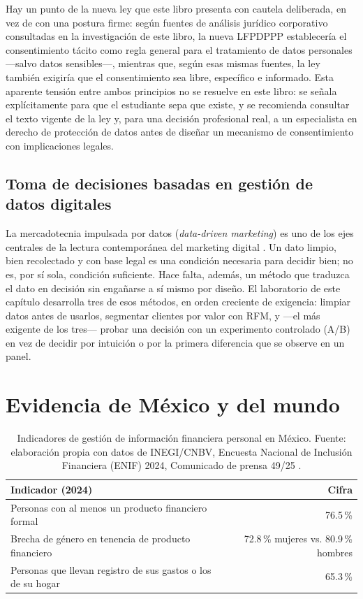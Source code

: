 Hay un punto de la nueva ley que este libro presenta con cautela deliberada,
en vez de con una postura firme: según fuentes de análisis jurídico
corporativo consultadas en la investigación de este libro, la nueva LFPDPPP
establecería el consentimiento tácito como regla general para el tratamiento
de datos personales —salvo datos sensibles—, mientras que, según esas mismas
fuentes, la ley también exigiría que el consentimiento sea libre, específico
e informado. Esta aparente tensión entre ambos principios no se resuelve en
este libro: se señala explícitamente para que el estudiante sepa que existe,
y se recomienda consultar el texto vigente de la ley y, para una decisión
profesional real, a un especialista en derecho de protección de datos antes
de diseñar un mecanismo de consentimiento con implicaciones legales.

\subsection{Toma de decisiones basadas en gestión de datos digitales}

La mercadotecnia impulsada por datos (\textit{data-driven marketing}) es uno
de los ejes centrales de la lectura contemporánea del marketing digital
\parencite{kotler2021marketing50}. Un dato limpio, bien recolectado y con
base legal es una condición necesaria para decidir bien; no es, por sí sola,
condición suficiente. Hace
falta, además, un método que traduzca el dato en decisión sin engañarse a
sí mismo por diseño. El laboratorio de este capítulo desarrolla tres de esos
métodos, en orden creciente de exigencia: limpiar datos antes de usarlos,
segmentar clientes por valor con RFM, y —el más exigente de los tres— probar
una decisión con un experimento controlado (A/B) en vez de decidir por
intuición o por la primera diferencia que se observe en un panel.

\section{Evidencia de México y del mundo}

\begin{table}[htbp]
\centering
\begin{tabular}{@{}lr@{}}
\toprule
Indicador (2024) & Cifra \\
\midrule
Personas con al menos un producto financiero formal & 76.5\,\% \\
Brecha de género en tenencia de producto financiero & 72.8\,\% mujeres vs. 80.9\,\% hombres \\
Personas que llevan registro de sus gastos o los de su hogar & 65.3\,\% \\
\bottomrule
\end{tabular}
\caption{Indicadores de gestión de información financiera personal en
México. Fuente: elaboración propia con datos de INEGI/CNBV, Encuesta
Nacional de Inclusión Financiera (ENIF) 2024, Comunicado de prensa 49/25
\parencite{inegi2025enif}.}
\label{tab:cap03-enif}
\end{table}

